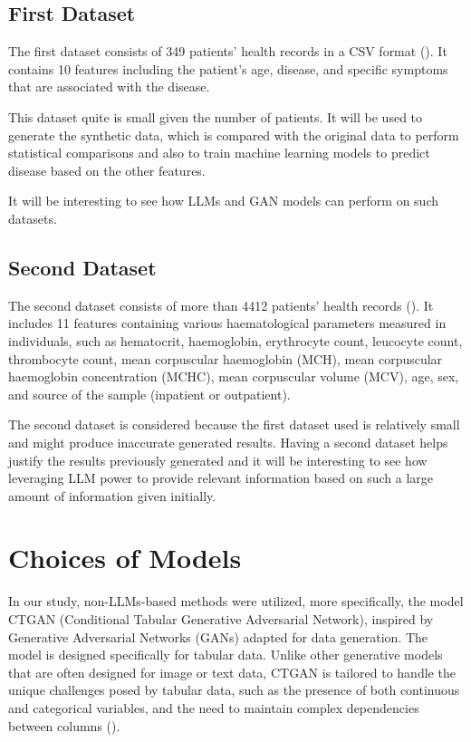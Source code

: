 \subsection{First Dataset}

The first dataset consists of 349 patients' health records in a CSV format (\cite{uom190346a_disease_symptoms_2021}). It contains 10 features including the patient's age, disease, and specific symptoms that are associated with the disease. 


This dataset quite is small given the number of patients. It will be used to generate the synthetic data, which is compared with the original data to perform statistical comparisons and also to train machine learning models to predict disease based on the other features.

It will be interesting to see how LLMs and GAN models can perform on such datasets.



\subsection{Second Dataset}

The second dataset consists of more than 4412 patients' health records (\cite{palivela_patient_treatment_2021}). It includes 11 features containing various haematological parameters measured in individuals, such as hematocrit, haemoglobin, erythrocyte count, leucocyte count, thrombocyte count, mean corpuscular haemoglobin (MCH), mean corpuscular haemoglobin concentration (MCHC), mean corpuscular volume (MCV), age, sex, and source of the sample (inpatient or outpatient). 

The second dataset is considered because the first dataset used is relatively small and might produce inaccurate generated results. Having a second dataset helps justify the results previously generated and it will be interesting to see how leveraging LLM power to provide relevant information based on such a large amount of information given initially.


\section{Choices of Models}

In our study, non-LLMs-based methods were utilized, more specifically, the model CTGAN (Conditional Tabular Generative Adversarial Network), inspired by Generative Adversarial Networks (GANs) adapted for data generation. The model is designed specifically for tabular data. Unlike other generative models that are often designed for image or text data, CTGAN is tailored to handle the unique challenges posed by tabular data, such as the presence of both continuous and categorical variables, and the need to maintain complex dependencies between columns (\cite{Xu2019}).


